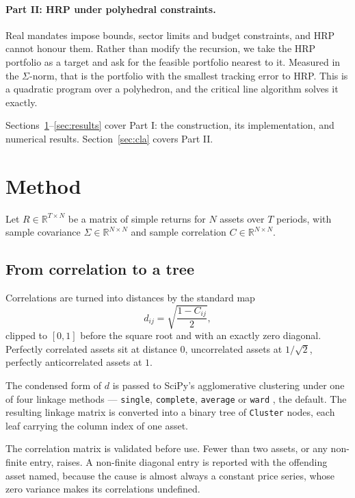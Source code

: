 \documentclass[11pt,a4paper]{article}
\newcommand{\code}[1]{\texttt{#1}}
\newcounter{algo}
\begin{document}
\paragraph{Part II: HRP under polyhedral constraints.}
Real mandates impose bounds, sector limits and budget constraints, and HRP
cannot honour them. Rather than modify the recursion, we take the HRP portfolio
as a target and ask for the feasible portfolio nearest to it. Measured in the
$\Sigma$-norm, that is the portfolio with the smallest tracking error to HRP.
This is a quadratic program over a polyhedron, and the critical line algorithm
\citep{markowitz1956, schmelzer2026cla} solves it exactly.

Sections~\ref{sec:method}--\ref{sec:results} cover Part I: the construction, its
implementation, and numerical results. Section~\ref{sec:cla} covers Part II.

\section{Method}
\label{sec:method}

Let $R \in \mathbb{R}^{T \times N}$ be a matrix of simple returns for $N$ assets
over $T$ periods, with sample covariance $\Sigma \in \mathbb{R}^{N \times N}$
and sample correlation $C \in \mathbb{R}^{N \times N}$.

\subsection{From correlation to a tree}

Correlations are turned into distances by the standard map
\begin{equation}
  d_{ij} = \sqrt{\frac{1 - C_{ij}}{2}},
  \label{eq:dist}
\end{equation}
clipped to $[0,1]$ before the square root and with an exactly zero diagonal.
Perfectly correlated assets sit at distance $0$, uncorrelated assets at
$1/\sqrt{2}$, perfectly anticorrelated assets at $1$.

The condensed form of $d$ is passed to SciPy's agglomerative clustering
\citep{virtanen2020} under one of four linkage methods --- \code{single},
\code{complete}, \code{average} or \code{ward} \citep{ward1963}, the default.
The resulting linkage matrix is converted into a binary tree of \code{Cluster}
nodes, each leaf carrying the column index of one asset.

The correlation matrix is validated before use. Fewer than two assets, or any
non-finite entry, raises. A non-finite diagonal entry is reported with the
offending asset named, because the cause is almost always a constant price
series, whose zero variance makes its correlations undefined.
\end{document}
